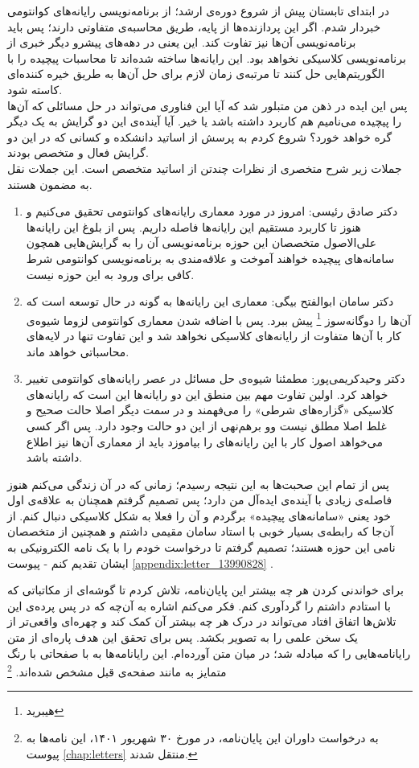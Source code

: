 در ابتدای تابستان پیش از شروع دوره‌ی ارشد؛ از برنامه‌نویسی رایانه‌های کوانتومی خبردار شدم. اگر این پردازنده‌ها از پایه، طریق محاسبه‌ی متفاوتی دارند؛ پس باید برنامه‌نویسی آن‌ها نیز تفاوت کند. این یعنی در دهه‌های پیشرو دیگر خبری از برنامه‌نویسی کلاسیکی نخواهد بود. این رایانه‌ها ساخته شده‌اند تا محاسبات پیچیده را با الگوریتم‌هایی حل کنند تا مرتبه‌ی زمان لازم برای حل آن‌ها به طریق خیره کننده‌ای کاسته شود.\\
پس این ایده در ذهن من متبلور شد که آیا این فناوری می‌تواند در حل مسائلی که آن‌ها را پیچیده می‌نامیم هم کاربرد داشته باشد یا خیر.  آیا آینده‌ی این دو گرایش به یک دیگر گره خواهد خورد؟ شروع کردم به پرسش از اساتید دانشکده و کسانی که در این دو گرایش فعال و متخصص بودند.\\
جملات زیر شرح متخصری از نظرات چندتن از اساتید متخصص است. این جملات نقل به مضمون هستند.
\begin{enumerate}
	\item 
	دکتر صادق رئیسی: امروز در مورد معماری رایانه‌های کوانتومی تحقیق می‌کنیم و هنوز تا کاربرد مستقیم این رایانه‌ها فاصله داریم. پس از بلوغ این رایانه‌ها علی‌الاصول متخصصان این حوزه برنامه‌نویسی آن را به گرایش‌هایی همچون سامانه‌های پیچیده خواهند آموخت و علاقه‌مندی به برنامه‌نویسی کوانتومی شرط کافی برای ورود به این حوزه نیست.
	\item
	دکتر سامان ابوالفتح بیگی: معماری این رایانه‌ها به گونه در حال توسعه است که آن‌ها را دوگانه‌سوز \footnote{هیبرید} پیش ببرد. پس با اضافه شدن معماری کوانتومی لزوما شیوه‌ی کار با آن‌ها متفاوت از رایانه‌های کلاسیکی نخواهد شد و این تفاوت تنها در لایه‌های محاسباتی خواهد ماند.
	\item 
	دکتر وحیدکریمی‌پور: مطمئنا شیوه‌ی حل مسائل در عصر رایانه‌های کوانتومی تغییر خواهد کرد. اولین تفاوت مهم بین منطق این دو رایانه‌ها این است که رایانه‌های کلاسیکی «گزاره‌های شرطی» را می‌فهمند و در سمت دیگر اصلا حالت صحیح و غلط اصلا مطلق نیست وو برهم‌نهی از این دو حالت وجود دارد. پس اگر کسی می‌خواهد اصول کار با این رایانه‌های را بیاموزد باید از معماری آن‌ها نیز اطلاع داشته باشد.

\end{enumerate}



پس از تمام این صحبت‌ها به این نتیجه رسیدم؛ زمانی که در آن زندگی می‌کنم هنوز فاصله‌ی زیادی با آینده‌ی ایده‌آل من دارد؛ پس تصمیم گرفتم همچنان به علاقه‌ی اول خود یعنی «سامانه‌های پیچیده» برگردم و آن را فعلا به شکل کلاسیکی دنبال کنم. از آن‌جا که رابطه‌ی بسیار خوبی با استاد سامان مقیمی داشتم و همچنین از متخصصان نامی این حوزه هستند؛ تصمیم گرفتم تا درخواست خودم را با یک نامه الکترونیکی به ایشان تقدیم کنم - پیوست
\ref{appendix:letter_13990828}
.


برای خواندنی کردن هر چه بیشتر این پایان‌نامه، تلاش کردم تا گوشه‌ای از مکاتباتی که با استادم داشتم را گردآوری کنم. فکر می‌کنم اشاره به آن‌چه که  در پس پرده‌ی این تلاش‌ها اتفاق افتاد می‌تواند در درک هر چه بیشتر آن کمک کند و چهره‌ای واقعی‌تر از یک سخن علمی را به تصویر بکشد. پس برای تحقق این هدف پاره‌ای از متن رایانامه‌هایی را که مبادله شد؛ در میان متن آورده‌ام. این رایانامه‌ها به با صفحاتی با رنگ متمایز به مانند صفحه‌ی قبل مشخص شده‌اند.
\footnote{
به درخواست داوران این پایان‌نامه، در مورخ ۳۰ شهریور ۱۴۰۱، این نامه‌ها به پیوست 
\ref{chap:letters}
منتقل شدند.
}
